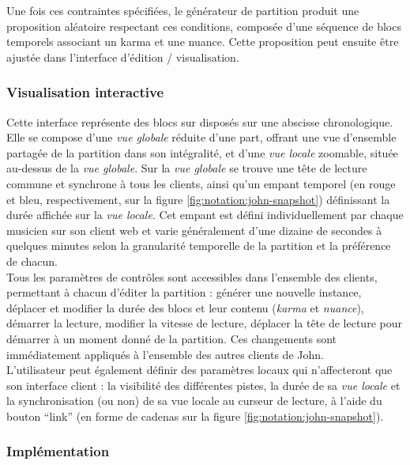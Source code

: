 \noindent Une fois ces contraintes spécifiées, le générateur de partition produit une proposition aléatoire respectant ces conditions, composée d'une séquence de blocs temporels associant un karma et une nuance. Cette proposition peut ensuite être ajustée dans l'interface d'édition / visualisation.

\subsubsection{Visualisation interactive}

\noindent Cette interface représente des blocs sur disposés sur une abscisse chronologique. Elle se compose d'une \textit{vue globale} réduite d'une part, offrant une vue d'ensemble partagée de la partition dans son intégralité, et d'une \textit{vue locale} zoomable, située au-dessus de la \textit{vue globale}. Sur la \textit{vue globale} se trouve une tête de lecture commune et synchrone à tous les clients, ainsi qu'un empant temporel (en rouge et bleu, respectivement, sur la figure \ref{fig:notation:john-snapshot}) définissant la durée affichée sur la \textit{vue locale}. Cet empant est défini individuellement par chaque musicien sur son client web et varie généralement d'une dizaine de secondes à quelques minutes selon la granularité temporelle de la partition et la préférence de chacun.\\
\indent Tous les paramètres de contrôles sont accessibles dans l'ensemble des clients, permettant à chacun d'éditer la partition : générer une nouvelle instance, déplacer et modifier la durée des blocs et leur contenu (\textit{karma} et \textit{nuance}), démarrer la lecture, modifier la vitesse de lecture, déplacer la tête de lecture pour démarrer à un moment donné de la partition. Ces changements sont immédiatement appliqués à l'ensemble des autres clients de John.\\
\indent L'utilisateur peut également définir des paramètres locaux qui n'affecteront que son interface client : la visibilité des différentes pistes, la durée de sa \textit{vue locale} et la synchronisation (ou non) de sa vue locale au curseur de lecture, à l'aide du bouton ``link'' (en forme de cadenas sur la figure \ref{fig:notation:john-snapshot}).

\subsubsection{Implémentation}

